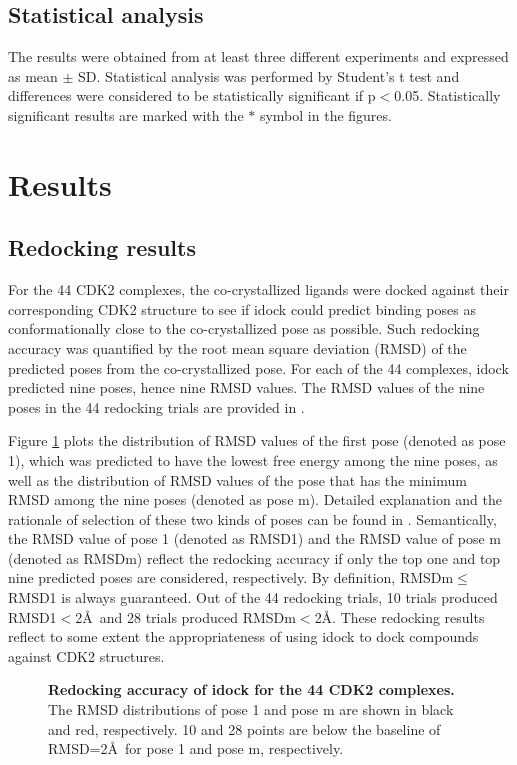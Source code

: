 \documentclass[10pt,letterpaper]{article}
\begin{document}
\subsection*{Statistical analysis}

The results were obtained from at least three different experiments and expressed as mean $\pm$ SD. Statistical analysis was performed by Student's t test and differences were considered to be statistically significant if p$<$0.05. Statistically significant results are marked with the $\ast$ symbol in the figures.

\section*{Results}

\subsection*{Redocking results}

For the 44 CDK2 complexes, the co-crystallized ligands were docked against their corresponding CDK2 structure to see if idock could predict binding poses as conformationally close to the co-crystallized pose as possible. Such redocking accuracy was quantified by the root mean square deviation (RMSD) of the predicted poses from the co-crystallized pose. For each of the 44 complexes, idock predicted nine poses, hence nine RMSD values. The RMSD values of the nine poses in the 44 redocking trials are provided in .

Figure \ref{RMSD1m} plots the distribution of RMSD values of the first pose (denoted as pose 1), which was predicted to have the lowest free energy among the nine poses, as well as the distribution of RMSD values of the pose that has the minimum RMSD among the nine poses (denoted as pose m). Detailed explanation and the rationale of selection of these two kinds of poses can be found in \cite{1362}. Semantically, the RMSD value of pose 1 (denoted as RMSD1) and the RMSD value of pose m (denoted as RMSDm) reflect the redocking accuracy if only the top one and top nine predicted poses are considered, respectively. By definition, RMSDm$\leq$RMSD1 is always guaranteed. Out of the 44 redocking trials, 10 trials produced RMSD1$<$2\AA\ and 28 trials produced RMSDm$<$2\AA. These redocking results reflect to some extent the appropriateness of using idock to dock compounds against CDK2 structures.

\begin{figure}%
\caption{{\bf Redocking accuracy of idock for the 44 CDK2 complexes.} The RMSD distributions of pose 1 and pose m are shown in black and red, respectively. 10 and 28 points are below the baseline of RMSD=2\AA\ for pose 1 and pose m, respectively.}
\label{RMSD1m}
\end{figure}
\end{document}
